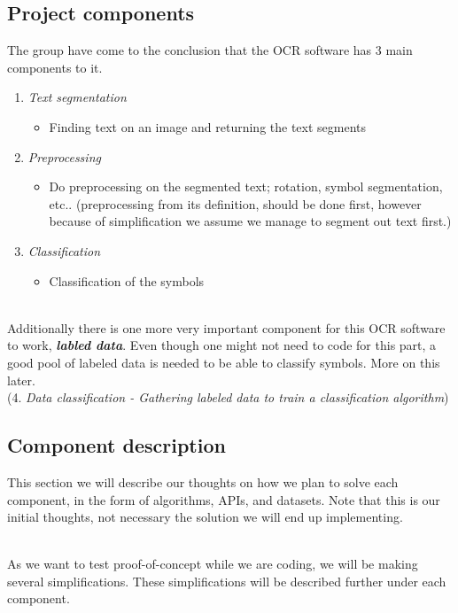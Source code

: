 \documentclass[11pt,a4paper,english]{article}
\begin{document}
\subsection{Project components}
The group have come to the conclusion that the OCR software has 3 main
components to it.
\begin{enumerate}
 \item{\textit{Text segmentation}}
 \begin{itemize}
  \item{Finding text on an image and returning the text segments}
 \end{itemize}
 \item{\textit{Preprocessing}}
 \begin{itemize}
  \item{Do preprocessing on the segmented text; rotation, symbol segmentation,
  etc.. (preprocessing from its definition, should be done first, however
  because of simplification we assume we manage to segment out text first.)}
 \end{itemize}
 \item{\textit{Classification}}
 \begin{itemize}
  \item{Classification of the symbols}
 \end{itemize}
\end{enumerate}
\noindent \\ Additionally there is one more very important component for this
OCR software to work, \textit{\textbf{labled data}}. Even though one might not
need to code for this part, a good pool of labeled data is needed to be able to
classify symbols. More on this later.
\noindent \\ (4. \textit{Data classification - Gathering labeled data to train a classification algorithm})

\subsection{Component description}
This section we will describe our thoughts on how we plan to solve each
component, in the form of algorithms, APIs, and datasets. Note that this is our
initial thoughts, not necessary the solution we will end up implementing.

\noindent \\ As we want to test proof-of-concept while we are coding, we will
be making several simplifications. These simplifications will be described
further under each component.
\end{document}
